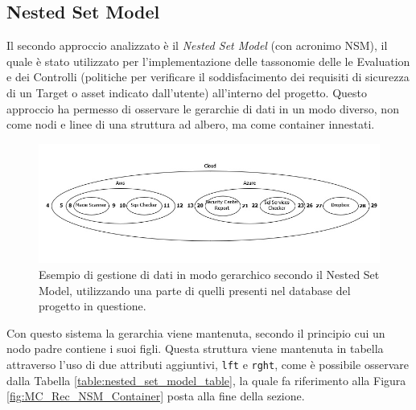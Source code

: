 \subsection{Nested Set Model}
Il secondo approccio analizzato è il \textit{Nested Set Model} (con acronimo NSM), il quale è stato utilizzato per l'implementazione delle tassonomie 
delle le Evaluation e dei Controlli (politiche per verificare il soddisfacimento dei requisiti di sicurezza di un Target o asset indicato dall'utente) 
all'interno del progetto.\hfill\break
Questo approccio ha permesso di osservare le gerarchie di dati in un modo diverso, non come nodi e linee di una struttura ad albero, ma 
come container innestati.
%
\begin{figure}[ht!]
    \centering
    \includegraphics[scale=0.73]{images/MC_Rec_NSM_Container(R).jpg}
    \caption[Gestione di dati, come container innestati, secondo il NSM]{Esempio di gestione di dati in modo gerarchico secondo il Nested Set Model, utilizzando una parte di quelli presenti nel database del 
    progetto in questione.}
    \label{fig:MC_Rec_NSM_Container_R}
\end{figure}
\hfill\break
%
Con questo sistema la gerarchia viene mantenuta, secondo il principio cui un nodo padre contiene i suoi figli. Questa struttura 
viene mantenuta in tabella attraverso l'uso di due attributi aggiuntivi, \texttt{lft} e \texttt{rght}, come è possibile osservare 
dalla Tabella \ref{table:nested_set_model_table}, la quale fa riferimento alla Figura \ref{fig:MC_Rec_NSM_Container} 
posta alla fine della sezione.
%
\newpage
%
